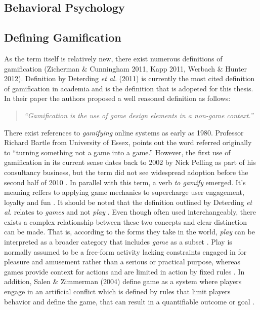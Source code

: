 \subsection{Behavioral  Psychology}
\subsection{Defining Gamification}
As  the  term  itself  is  relatively  new,  there  exist  numerous definitions  of  gamification  (Zicherman \&  Cunningham 2011, Kapp 2011, Werbach \& Hunter 2012). Definition by Deterding \textit{et al.} (2011) is currently the most cited definition of gamification in academia and is the definition that is adopeted for this thesis. In their paper the authors proposed a well reasoned definition as follows:
\begin{quotation}
\textit{``Gamification is the use of game design elements in a non-game context.''}
\end{quotation}
There exist references to \textit{gamifying} online systems as early as 1980. Professor Richard Bartle from University of Essex, points out the word referred originally to ``turning something not a game into a game.''\cite{werbach2012win}%
 However, the first use of gamification in its current sense dates back to 2002 by Nick Pelling as part of his consultancy business, but the term did not see widespread adoption before the second half of 2010 \cite{marczewski2013gamification}. In parallel with this term, a verb \textit{to gamify} emerged. It's meaning reffers to applying game mechanics to supercharge user engagement, loyalty and fun \cite{toGamify}. 
It should be noted that the definition outlined by Deterding \textit{et al.} relates to \textit{games} and not \textit{play} \cite{deterding2011game}. %
Even though often used interchangeably, there exists a complex relationship between these two concepts and clear distinction can be made. That is, according to the forms they take in the world, \textit{play} can be interpreted as a broader category that includes \textit{game} as a subset \cite{salen2004rules}. Play is normally assumed to be a free-form activity lacking constraints engaged in for pleasure and amusement rather than a serious or practical purpose, whereas games provide context for actions and are limited in action by fixed rules \cite{juul2011half}. In addition, Salen \& Zimmerman (2004) define game as a system where players engage in an artificial conflict which is defined by rules that limit players behavior and define the game, that can result in a quantifiable outcome or goal \cite{salen2004rules}.%

